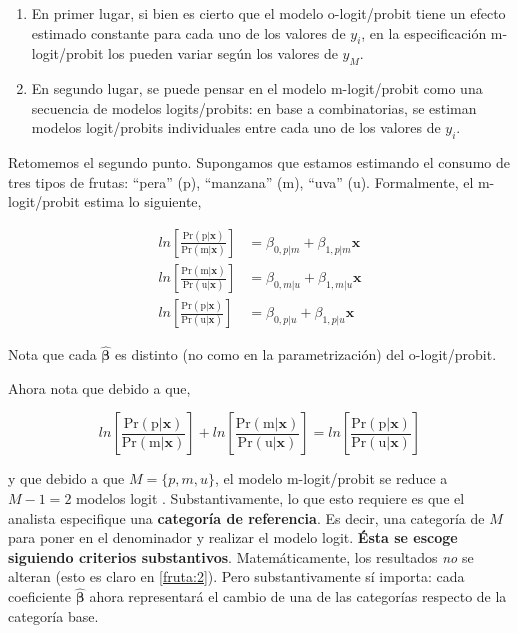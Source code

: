 \documentclass[onesided]{article}\usepackage[]{graphicx}\usepackage[]{color}
\begin{document}
\begin{enumerate}
\item En primer lugar, si bien es cierto que el modelo o-logit/probit tiene un efecto estimado \boldsymbol{$\hat\beta$} constante para cada uno de los valores de $y_{i}$, en la especificaci\'on m-logit/probit los \boldsymbol{$\hat\beta$} pueden variar seg\'un los valores de $y_{M}$.
\item En segundo lugar, se puede pensar en el modelo m-logit/probit como una secuencia de modelos logits/probits: en base a combinatorias, se estiman modelos logit/probits individuales entre cada uno de los valores de $y_{i}$.
\end{enumerate}

Retomemos el segundo punto. Supongamos que estamos estimando el consumo de tres tipos de frutas: ``pera'' (p), ``manzana'' (m), ``uva'' (u). Formalmente, el m-logit/probit estima lo siguiente,

\begin{equation}\label{fruta}
\begin{split}
ln[\frac{\text{Pr}(\text{p}|\boldsymbol{x})}{\text{Pr}(\text{m}|\boldsymbol{x})}] & = \beta_{0, p|m} + \beta_{1, p|m}\boldsymbol{x}\\
ln[\frac{\text{Pr}(\text{m}|\boldsymbol{x})}{\text{Pr}(\text{u}|\boldsymbol{x})}] & = \beta_{0, m|u} + \beta_{1, m|u}\boldsymbol{x}\\
ln[\frac{\text{Pr}(\text{p}|\boldsymbol{x})}{\text{Pr}(\text{u}|\boldsymbol{x})}] & = \beta_{0, p|u} + \beta_{1, p|u}\boldsymbol{x}
\end{split}
\end{equation}

Nota que cada $\boldsymbol{\hat\beta}$ es distinto (no como en la parametrizaci\'on) del o-logit/probit.

Ahora nota que debido a que,

\begin{equation}\label{fruta:2}
ln[\frac{\text{Pr}(\text{p}|\boldsymbol{x})}{\text{Pr}(\text{m}|\boldsymbol{x})}] +  ln[\frac{\text{Pr}(\text{m}|\boldsymbol{x})}{\text{Pr}(\text{u}|\boldsymbol{x})}] = ln[\frac{\text{Pr}(\text{p}|\boldsymbol{x})}{\text{Pr}(\text{u}|\boldsymbol{x})}]
\end{equation}

y que debido a que $M=\{p,m,u \}$, el modelo m-logit/probit se reduce a $M-1=2$ modelos logit \parencite[163]{Ward2018}. Substantivamente, lo que esto requiere es que el analista especifique una {\bf categor\'ia de referencia}. Es decir, una categor\'ia de $M$ para poner en el denominador y realizar el modelo logit. {\bf \'Esta se escoge siguiendo criterios substantivos}. Matem\'aticamente, los resultados \emph{no} se alteran (esto es claro en \autoref{fruta:2}). Pero substantivamente s\'i importa: cada coeficiente $\boldsymbol{\hat\beta}$ ahora representar\'a el cambio de una de las categor\'ias respecto de la categor\'ia base. 
\end{document}
